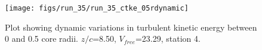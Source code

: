 \begin{figure}[H]
\centering
\texttt{[image: figs/run\_35/run\_35\_ctke\_05rdynamic]}
\caption{Plot showing dynamic variations in turbulent kinetic energy between 0 and 0.5 core radii. $z/c$=8.50, $V_{free}$=23.29, station 4.}
\label{fig:run_35_ctke_05rdynamic}
\end{figure}


